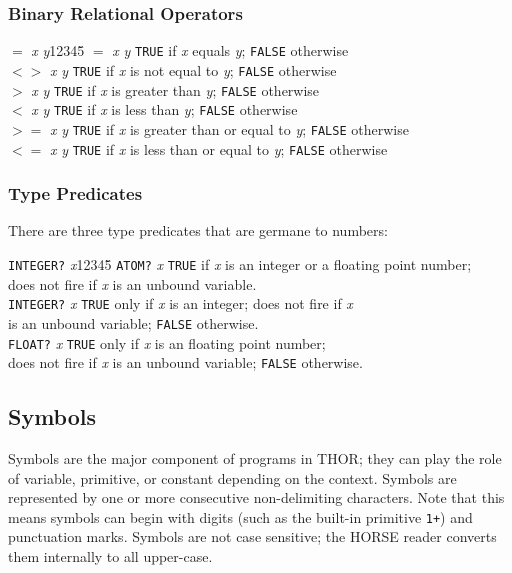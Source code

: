 \subsubsection{Binary Relational Operators}
\begin{tabbing}
{\tt $=$} {\sl x} {\sl y}12345\=\kill
{\tt $=$} {\sl x} {\sl y} \> {\tt TRUE} if {\sl x} equals {\sl y}; {\tt FALSE}
otherwise\\ 
{\tt $<>$} {\sl x} {\sl y} \> {\tt TRUE} if {\sl x} is not equal to {\sl y};
{\tt FALSE} otherwise\\ 
{\tt $>$} {\sl x} {\sl y} \> {\tt TRUE} if {\sl x} is greater than {\sl y};
{\tt FALSE} otherwise\\ 
{\tt $<$} {\sl x} {\sl y} \> {\tt TRUE} if {\sl x} is less than {\sl y};
{\tt FALSE} otherwise\\ 
{\tt $>=$} {\sl x} {\sl y} \> {\tt TRUE} if {\sl x} is greater than or equal
to {\sl y}; {\tt FALSE} otherwise\\ 
{\tt $<=$} {\sl x} {\sl y} \> {\tt TRUE} if {\sl x} is less than or equal
to {\sl y}; {\tt FALSE} otherwise
\end{tabbing}

\subsubsection{Type Predicates}

	There are three type predicates that are germane to numbers: 
\begin{tabbing}
{\tt INTEGER?} {\sl x}12345\=\kill
{\tt ATOM?} {\sl x}  \>  {\tt TRUE} if {\sl x} is an integer or a
floating point number;\\ \> does not fire if {\sl x} is
an unbound variable.\\
{\tt INTEGER?} {\sl x}  \> {\tt TRUE} only if {\sl x} is an integer; does not fire
 if {\sl x}\\ \> is an unbound variable; {\tt FALSE} otherwise.\\
{\tt FLOAT?} {\sl x} \> {\tt TRUE} only if {\sl x} is an floating point
number;\\ \> does not fire if {\sl x} is an unbound variable; 
{\tt FALSE} otherwise.
\end{tabbing}


\subsection{Symbols}

	Symbols are the major component of programs in THOR; they can play the
role of variable, primitive, or constant depending on the context.
Symbols are represented by one or more consecutive non-delimiting characters.
Note that this means symbols can begin with digits (such as the
built-in primitive {\tt 1+}) and punctuation marks.  Symbols are not
case sensitive; the HORSE reader converts them internally to all upper-case.

